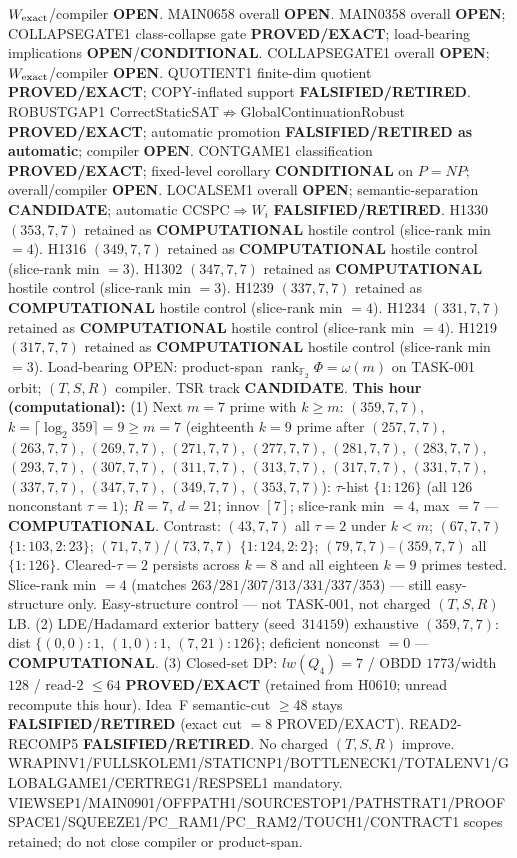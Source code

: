 \documentclass[11pt]{article}
\begin{document}
$W_{\rm exact}$/compiler \textbf{OPEN}.
MAIN0658 overall \textbf{OPEN}.
MAIN0358 overall \textbf{OPEN}; COLLAPSEGATE1 class-collapse gate \textbf{PROVED/EXACT};
load-bearing implications \textbf{OPEN}/\textbf{CONDITIONAL}.
COLLAPSEGATE1 overall \textbf{OPEN}; $W_{\rm exact}$/compiler \textbf{OPEN}.
QUOTIENT1 finite-dim quotient \textbf{PROVED/EXACT}; COPY-inflated support \textbf{FALSIFIED/RETIRED}.
ROBUSTGAP1 CorrectStaticSAT$\not\Rightarrow$GlobalContinuationRobust \textbf{PROVED/EXACT};
automatic promotion \textbf{FALSIFIED/RETIRED as automatic}; compiler \textbf{OPEN}.
CONTGAME1 classification \textbf{PROVED/EXACT}; fixed-level corollary \textbf{CONDITIONAL} on $P=NP$;
overall/compiler \textbf{OPEN}.
LOCALSEM1 overall \textbf{OPEN}; semantic-separation \textbf{CANDIDATE}; automatic CCSPC$\Rightarrow W_i$
\textbf{FALSIFIED/RETIRED}.
H1330 $(353,7,7)$ retained as \textbf{COMPUTATIONAL} hostile control (slice-rank min $=4$).
H1316 $(349,7,7)$ retained as \textbf{COMPUTATIONAL} hostile control (slice-rank min $=3$).
H1302 $(347,7,7)$ retained as \textbf{COMPUTATIONAL} hostile control (slice-rank min $=3$).
H1239 $(337,7,7)$ retained as \textbf{COMPUTATIONAL} hostile control (slice-rank min $=4$).
H1234 $(331,7,7)$ retained as \textbf{COMPUTATIONAL} hostile control (slice-rank min $=4$).
H1219 $(317,7,7)$ retained as \textbf{COMPUTATIONAL} hostile control (slice-rank min $=3$).
Load-bearing OPEN: product-span $\operatorname{rank}_{\mathbb F_2}\Phi=\omega(m)$ on TASK-001 orbit;
$(T,S,R)$ compiler. TSR track \textbf{CANDIDATE}.
\textbf{This hour (computational):}
(1) Next $m{=}7$ prime with $k{\ge}m$: $(359,7,7)$, $k{=}\lceil\log_2 359\rceil=9{\ge}m{=}7$
(eighteenth $k{=}9$ prime after $(257,7,7)$, $(263,7,7)$, $(269,7,7)$, $(271,7,7)$, $(277,7,7)$, $(281,7,7)$, $(283,7,7)$, $(293,7,7)$, $(307,7,7)$, $(311,7,7)$, $(313,7,7)$, $(317,7,7)$, $(331,7,7)$, $(337,7,7)$, $(347,7,7)$, $(349,7,7)$, $(353,7,7)$):
$\tau$-hist $\{1{:}126\}$ (all $126$ nonconstant $\tau{=}1$); $R{=}7$, $d{=}21$; innov $[7]$;
slice-rank min $=4$, max $=7$ --- \textbf{COMPUTATIONAL}.
Contrast: $(43,7,7)$ all $\tau{=}2$ under $k{<}m$; $(67,7,7)$ $\{1{:}103,2{:}23\}$;
$(71,7,7)$/$(73,7,7)$ $\{1{:}124,2{:}2\}$; $(79,7,7)$--$(359,7,7)$ all $\{1{:}126\}$.
Cleared-$\tau{=}2$ persists across $k{=}8$ and all eighteen $k{=}9$ primes tested.
Slice-rank min $=4$ (matches $263$/$281$/$307$/$313$/$331$/$337$/$353$) --- still easy-structure only.
Easy-structure control --- not TASK-001, not charged $(T,S,R)$ LB.
(2) LDE/Hadamard exterior battery (seed~$314159$) exhaustive $(359,7,7)$:
dist $\{(0,0){:}1,\,(1,0){:}1,\,(7,21){:}126\}$; deficient nonconst $=0$ --- \textbf{COMPUTATIONAL}.
(3) Closed-set DP: $lw(Q_4)=7$ / OBDD $1773$/width $128$ / read-$2$ $\le64$
\textbf{PROVED/EXACT} (retained from H0610; unread recompute this hour).
Idea~F semantic-cut $\ge48$ stays \textbf{FALSIFIED/RETIRED} (exact cut $=8$ PROVED/EXACT).
READ2-RECOMP5 \textbf{FALSIFIED/RETIRED}. No charged $(T,S,R)$ improve.
WRAPINV1/FULLSKOLEM1/STATICNP1/BOTTLENECK1/TOTALENV1/GLOBALGAME1/CERTREG1/RESPSEL1 mandatory.
VIEWSEP1/MAIN0901/OFFPATH1/SOURCESTOP1/PATHSTRAT1/PROOFSPACE1/SQUEEZE1/PC\_RAM1/PC\_RAM2/TOUCH1/CONTRACT1 scopes retained; do not close compiler or product-span.
\end{document}
